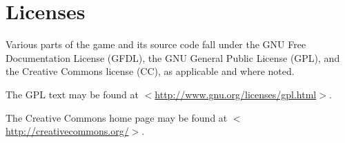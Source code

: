 \section{Licenses}

Various parts of the game and its source code fall under the GNU Free Documentation License (GFDL), the GNU General Public License (GPL), and the Creative Commons license (CC), as applicable and where noted.

The GPL text may be found at \href{http://www.gnu.org/licenses/gpl.html}{$<$http://www.gnu.org/licenses/gpl.html$>$}.

The Creative Commons home page may be found at \href{http://creativecommons.org/}{$<$http://creativecommons.org/$>$}.

